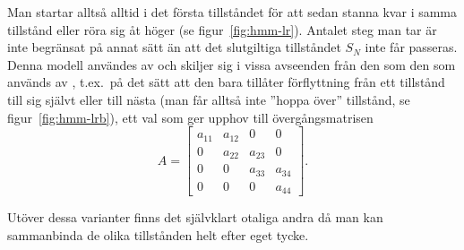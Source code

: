 \documentclass[../rapport_MVEX01-11-05]{subfiles}
\begin{document}
Man startar alltså alltid i det första tillståndet för att sedan
stanna kvar i samma tillstånd eller röra sig åt höger (se
figur~\vref{fig:hmm-lr}). Antalet steg
man tar är inte begränsat på annat sätt än att det slutgiltiga
tillståndet $S_N$ inte får passeras. Denna modell användes av
 och skiljer sig i vissa avseenden från
den som den som används av , t.ex.~på det sätt att
den bara tillåter förflyttning från
ett tillstånd till sig självt eller till nästa (man får alltså inte ''hoppa
över'' tillstånd, se figur~\vref{fig:hmm-lrb}), ett val som ger upphov
till övergångsmatrisen
\begin{equation*}
A = \begin{bmatrix}
a_{11} & a_{12} & 0 & 0\\
0 & a_{22} & a_{23} & 0\\
0 & 0 & a_{33} & a_{34}\\
0 & 0 & 0 & a_{44}
\end{bmatrix}.  
\end{equation*} 

Utöver dessa varianter finns det självklart otaliga andra då man kan
sammanbinda de olika tillstånden helt efter eget tycke.

\end{document}
